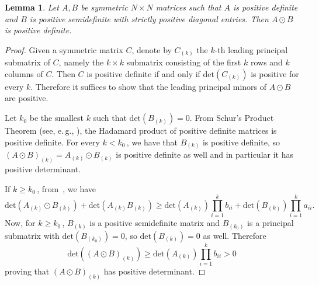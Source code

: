 \documentclass[11pt]{article}
\numberwithin{equation}{section}
\newtheorem{lemma}[theorem]{Lemma}
\theoremstyle{definition}
\theoremstyle{plain}
\newcommand{\eg}{e.\,g.}
\providecommand{\textprod}{}
\renewcommand{\textprod}{{\textstyle \prod}}
\renewcommand{\det}{\mathrm{det}}
\begin{document}
\begin{lemma}\label{lemma: posdef odot positive psd is pos def}
Let $A,B$ be symmetric $N \times N$ matrices such that $A$ is positive definite and $B$ is positive semidefinite with strictly positive diagonal entries. 
Then $A \odot B$ is positive definite.
\end{lemma}
\begin{proof}
Given a symmetric matrix $C$, denote by $C_{(k)}$ the $k$-th leading principal submatrix of $C$, namely the $k\times k$ submatrix consisting of the first $k$ rows and $k$ columns of $C$. Then $C$ is positive definite if and only if $\det(C_{(k)})$ is positive for every $k$. Therefore it suffices to show that the leading principal minors of $A \odot B$ are positive.

Let $k_0$ be the smallest $k$ such that $\det(B_{(k)}) = 0$. {}From Schur's Product Theorem (see, \eg, \cite[Ex.~36.2.1]{MR1277174}), the Hadamard product of positive definite matrices is positive definite. For every $k < k_0$\,, we have that $B_{(k)}$ is positive definite, so $(A\odot B)_{(k)} = A_{(k)} \odot B_{(k)}$ is positive definite as well and in particular it has positive determinant.

If $k \geq k_0$\,, from~\cite[Eqn.~1.11]{Lynn:schurProductInequalities}, we have 
 \[
  \det(A_{(k)} \odot B_{(k)}) + \det(A_{(k)}B_{(k)}) \geq \det(A_{(k)}) \textprod_{i=1}^{k} b_{ii} + \det(B_{(k)}) \textprod_{i=1}^{k} a_{ii}.
 \]
Now, for $k \geq k_0$\,, $B_{(k)}$ is a positive semidefinite matrix and $B_{(k_0)}$ is a principal submatrix with $\det( B_{(k_0)})= 0$, so $\det( B_{(k)}) = 0$ as well. Therefore
 \[
 \det((A \odot B)_{(k)} ) \geq \det(A_{(k)}) \textprod_{i=1}^k b_{ii} > 0
\]
proving that $(A \odot B)_{(k)} $ has positive determinant.  
\end{proof}
\end{document}
